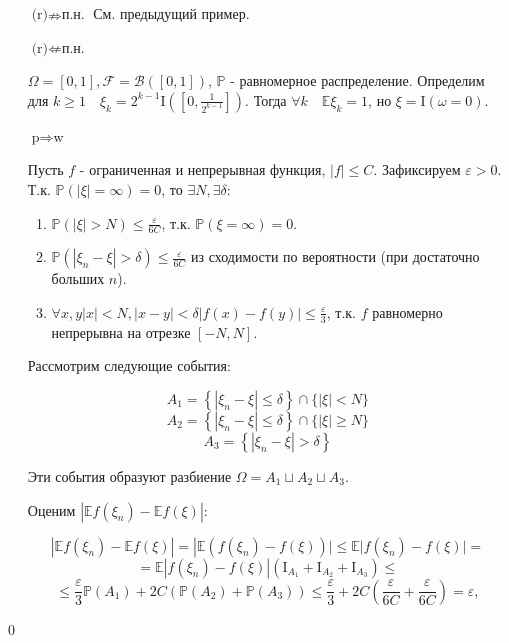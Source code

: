 \documentclass[oneside,final,14pt]{extreport}
\renewenvironment{proof}{{\bfseries Доказательство.}}{\qed}
\theoremstyle{plain}
\theoremstyle{definition}
\theoremstyle{named}
\begin{document}
\begin{proof}
\begin{itemize}
    \item[$\text{(r)} \nRightarrow \text{п.н.}$] См. предыдущий пример.
    
    \item[$\text{(r)} \nLeftarrow \text{п.н.}$]
    
    $\Omega = [0,1], \mathcal{F} = \mathcal{B}([0,1])$, $\mathbb{P}$ - равномерное распределение. Определим для $k \geqslant 1 \quad \xi_k = 2^{k-1} \mathrm{I}\left(\left[0, \frac{1}{2^{k-1}}\right]\right).$ Тогда $\forall k \quad \mathbb{E}\xi_k = 1$, но $\xi = \mathrm{I}(\omega = 0)$.
    
    \item[$\text{p} \Rightarrow \text{w}$]
    
    Пусть $f$ - ограниченная и непрерывная функция, $|f| \leqslant C$. Зафиксируем $\varepsilon > 0$. Т.к. $\mathbb{P}(|\xi| = \infty) = 0$, то $\exists N, \exists \delta$:
    
    \begin{enumerate}
        \item $\mathbb{P}(|\xi| > N) \leqslant \frac{\varepsilon}{6C}$, т.к. $\mathbb{P}(\xi = \infty) = 0$.
        \item $\mathbb{P}(|\xi_n - \xi| > \delta) \leqslant \frac{\varepsilon}{6C}$ из сходимости по вероятности (при достаточно больших $n$).
        \item $\forall x,y |x| < N, |x - y| < \delta|f(x) - f(y)| \leqslant \frac{\varepsilon}{3}$, т.к. $f$ равномерно непрерывна на отрезке $[-N, N]$.
    \end{enumerate}
    
    Рассмотрим следующие события:
    
    $$ A_{1}=\left\{\left|\xi_{n}-\xi\right| \leqslant \delta\right\} \cap\{|\xi|<N\} $$
    $$ A_{2}=\left\{\left|\xi_{n}-\xi\right| \leqslant \delta\right\} \cap\{|\xi| \geqslant N\} $$
    $$ A_{3}=\left\{\left|\xi_{n}-\xi\right|>\delta\right\} $$
    
    Эти события образуют разбиение $\Omega=A_{1} \sqcup A_{2} \sqcup A_{3} $. 
    
    Оценим $|\mathbb{E}f(\xi_n) - \mathbb{E}f(\xi)|$:
    
    $$\left|\mathbb{E} f\left(\xi_{n}\right)-\mathbb{E} f(\xi)\right|=\left|\mathbb{E}\left(f\left(\xi_{n}\right)-f(\xi)\right)|\leqslant 
    \mathbb{E}| f\left(\xi_{n}\right)-f(\xi) |=\right.$$
    $$=\mathbb{E}\left|f\left(\xi_{n}\right)-f(\xi)\right|\left(\mathrm{I}_{A_{1}}+\mathrm{I}_{A_{2}}+\mathrm{I}_{A_{3}}\right) \leq$$
    $$\leqslant \frac{\varepsilon}{3} \mathbb{P}\left(A_{1}\right)+2 C\left(\mathbb{P}\left(A_{2}\right)+\mathbb{P}\left(A_{3}\right)\right) \leqslant \frac{\varepsilon}{3}+2 C\left(\frac{\varepsilon}{6 C}+\frac{\varepsilon}{6 C}\right)=\varepsilon,$$
    

\end{itemize}
\end{proof}
\end{document}
